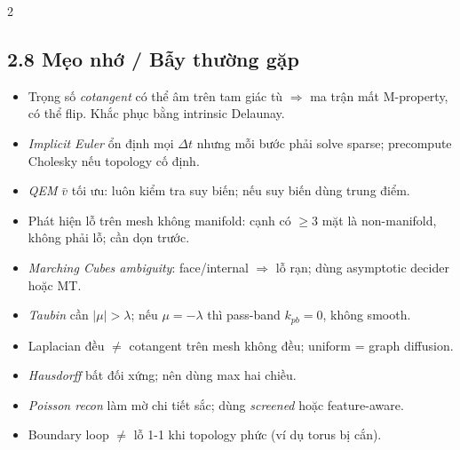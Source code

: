 \begin{paracol}{2}
\subsection*{2.8 Mẹo nhớ / Bẫy thường gặp}
\begin{itemize}[leftmargin=*,nosep]
  \item Trọng số \emph{cotangent} có thể âm trên tam giác tù $\Rightarrow$ ma trận mất M-property, có thể flip. Khắc phục bằng intrinsic Delaunay.
  \item \emph{Implicit Euler} ổn định mọi $\Delta t$ nhưng mỗi bước phải solve sparse; precompute Cholesky nếu topology cố định.
  \item \emph{QEM} $\bar v$ tối ưu: luôn kiểm tra suy biến; nếu suy biến dùng trung điểm.
  \item Phát hiện lỗ trên mesh không manifold: cạnh có $\ge 3$ mặt là non-manifold, không phải lỗ; cần dọn trước.
  \item \emph{Marching Cubes ambiguity}: face/internal $\Rightarrow$ lỗ rạn; dùng asymptotic decider hoặc MT.
  \item \emph{Taubin} cần $|\mu|>\lambda$; nếu $\mu=-\lambda$ thì pass-band $k_{pb}=0$, không smooth.
  \item Laplacian đều $\ne$ cotangent trên mesh không đều; uniform = graph diffusion.
  \item \emph{Hausdorff} bất đối xứng; nên dùng max hai chiều.
  \item \emph{Poisson recon} làm mờ chi tiết sắc; dùng \emph{screened} hoặc feature-aware.
  \item Boundary loop $\ne$ lỗ 1-1 khi topology phức (ví dụ torus bị cắn).
\end{itemize}

\end{paracol}
